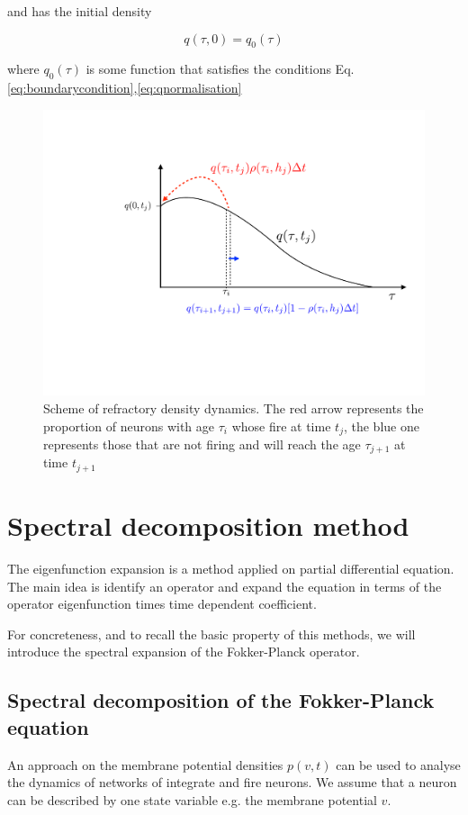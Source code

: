 \documentclass[12pt,twoside]{report}
\begin{document}
and has the initial density

\begin{equation}
\label{eq:qinitial}
q(\tau,0)=q_0(\tau)
\end{equation}

where $q_0(\tau)$ is some function that satisfies the conditions Eq.\eqref{eq:boundarycondition},\eqref{eq:qnormalisation}




\begin{figure}[h!]
	\centering
	\includegraphics[width=0.7\linewidth]{qtau.pdf}
	\caption{Scheme of refractory density dynamics. The red arrow represents the proportion of neurons with age $\tau_i$ whose fire at time $t_j$, the blue one represents those that are not firing and will reach the age $\tau_{j+1}$ at time $t_{j+1}$
	}
	\label{fig:qtau}
\end{figure}



\section{Spectral decomposition method}

The  eigenfunction expansion is a method applied on partial differential equation. The main idea is identify an operator and expand the equation in terms of the operator eigenfunction times time dependent coefficient. 


For concreteness, and to recall the basic property of this methods, we will introduce the spectral expansion of the Fokker-Planck operator.


\subsection{Spectral decomposition of the Fokker-Planck equation}
An approach on the membrane potential densities $p(v,t)$ can be used to analyse the dynamics of networks of integrate and fire neurons. We assume that a neuron can be described by one state variable e.g. the membrane potential $v$.
\end{document}
